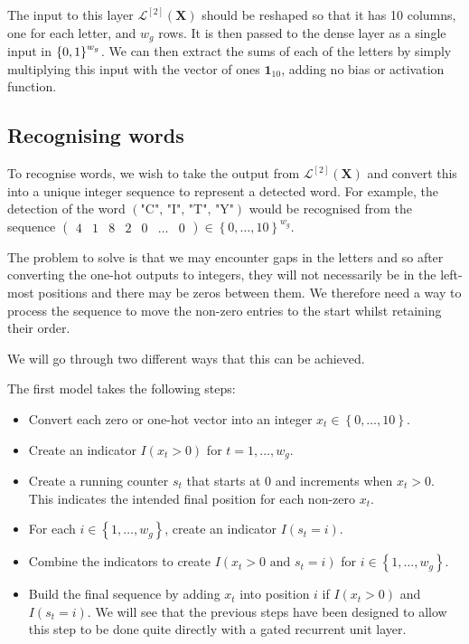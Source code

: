 \documentclass{somasmsc}
\begin{document}
The input to this layer $\mathcal{L}^{\left[2\right]}\left(\mathbf{X}\right)$ should be reshaped so that it has 10 columns, one for each letter, and $w_g$ rows. It is then passed to the dense layer as a single input in $\left\{0,1\right\}^{w_g \time 10}$. We can then extract the sums of each of the letters by simply multiplying this input with the vector of ones $\mathbf{1}_{10}$, adding no bias or activation function.

\subsection{Recognising words}\label{letters:words}

To recognise words, we wish to take the output from $\mathcal{L}^{\left[2\right]}\left(\mathbf{X}\right)$ and convert this into a unique integer sequence to represent a detected word. For example, the detection of the word $\left(\text{"C", "I", "T", "Y"}\right)$ would be recognised from the sequence
$\begin{pmatrix}
    4 & 1 & 8 & 2 & 0 & \dots & 0
\end{pmatrix} \in \left\{0, \dots, 10\right\}^{w_g}$.

The problem to solve is that we may encounter gaps in the letters and so after converting the one-hot outputs to integers, they will not necessarily be in the left-most positions and there may be zeros between them. We therefore need a way to process the sequence to move the non-zero entries to the start whilst retaining their order.

We will go through two different ways that this can be achieved.

The first model takes the following steps:
\begin{itemize}
    \item Convert each zero or one-hot vector into an integer $x_t \in \left\{0, \dots, 10\right\}$.
    \item Create an indicator $I\left(x_t > 0\right)$ for $t=1, \dots, w_g$.
    \item Create a running counter $s_t$ that starts at 0 and increments when $x_t > 0$. This indicates the intended final position for each non-zero $x_t$.
    \item For each $i \in \left\{1, \dots, w_g\right\}$, create an indicator $I\left(s_t = i\right)$.
    \item Combine the indicators to create $I\left(x_t > 0 \text{ and } s_t = i\right)$ for $i \in \left\{1, \dots, w_g\right\}$.
    \item Build the final sequence by adding $x_t$ into position $i$ if $I\left(x_t > 0\right)$ and $I\left(s_t = i\right)$. We will see that the previous steps have been designed to allow this step to be done quite directly with a gated recurrent unit layer.
\end{itemize}
\end{document}
